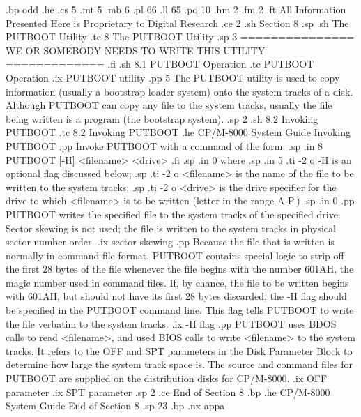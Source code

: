 .bp odd
.he
.cs 5
.mt 5
.mb 6
.pl 66
.ll 65
.po 10
.hm 2
.fm 2
.ft All Information Presented Here is Proprietary to Digital Research
.ce 2
.sh
Section 8
.sp
.sh
The PUTBOOT Utility
.tc 8  The PUTBOOT Utility
.sp 3
=============== WE OR SOMEBODY NEEDS TO WRITE THIS UTILITY =============
.fi
.sh
8.1  PUTBOOT Operation
.tc    PUTBOOT Operation      
.ix PUTBOOT utility
.pp 5
The PUTBOOT utility is used to copy information (usually a bootstrap loader
system) onto the system tracks of a disk.  Although PUTBOOT can copy any 
file to the system tracks, usually the file being written is a program 
(the bootstrap system).  
.sp 2
.sh
8.2  Invoking PUTBOOT
.tc    8.2  Invoking PUTBOOT
.he CP/M-8000 System Guide                            Invoking PUTBOOT
.pp
Invoke PUTBOOT with a command of the form:
.sp
.in 8
PUTBOOT [-H] <filename> <drive>
.fi
.sp
.in 0
where
.sp
.in 5
.ti -2
o -H is an optional flag discussed below;
.sp
.ti -2
o <filename> is the name of the file to be written to the system tracks;
.sp
.ti -2
o <drive> is the drive specifier for the drive to which <filename> is to be 
written (letter in the range A-P.)
.sp
.in 0
.pp
PUTBOOT writes the specified file to the system tracks of the specified 
drive.  Sector skewing is not used; the file is written to the system tracks 
in physical sector number order.  
.ix sector skewing
.pp
Because the file that is written is normally in command file format, 
PUTBOOT contains special logic to strip off the first 28 bytes of the file 
whenever the file begins with the number 601AH, the magic number used in 
command files.  If, by chance, the file to be written begins with 601AH, but 
should not have its first 28 bytes discarded, the -H flag should be specified 
in the PUTBOOT command line.  This flag tells PUTBOOT to write the file 
verbatim to the system tracks.
.ix -H flag
.pp
PUTBOOT uses BDOS calls to read <filename>, and used BIOS calls to
write <filename> to the system tracks.  It refers to the OFF and SPT 
parameters in the Disk Parameter Block to determine how large the system
track space is.  The source and command files for PUTBOOT are supplied
on the distribution disks for CP/M-8000.
.ix OFF parameter
.ix SPT parameter
.sp 2
.ce
End of Section 8
.bp
.he CP/M-8000 System Guide                            End of Section 8
.sp 23
.bp
.nx appa

